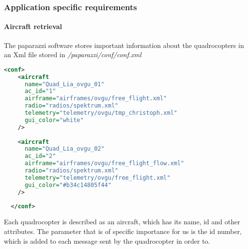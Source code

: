 \subsubsection{Application specific requirements}
\label{sec:requirementsApplication}

\paragraph{Aircraft retrieval}
The paparazzi software stores important information about the quadrocopters in an Xml file stored in \textit{/paparazzi/conf/conf.xml}

\begin{lstlisting}[basicstyle=\tiny, label={lst:AircraftXml}, language = Xml]
  <conf>
    <aircraft
      name="Quad_Lia_ovgu_01"
      ac_id="1"
      airframe="airframes/ovgu/free_flight.xml"
      radio="radios/spektrum.xml"
      telemetry="telemetry/ovgu/tmp_christoph.xml"
      gui_color="white"
    />
    
    <aircraft
      name="Quad_Lia_ovgu_02"
      ac_id="2"
      airframe="airframes/ovgu/free_flight_flow.xml"
      radio="radios/spektrum.xml"
      telemetry="telemetry/ovgu/free_flight.xml"
      gui_color="#b34c14805f44"
    />
  
  </conf>
\end{lstlisting}

Each quadrocopter is described as an aircraft, which has its name, id and other attributes. The parameter that is of specific importance for us is the id number, which is added to each message sent by the quadrocopter in order to.

 

  

